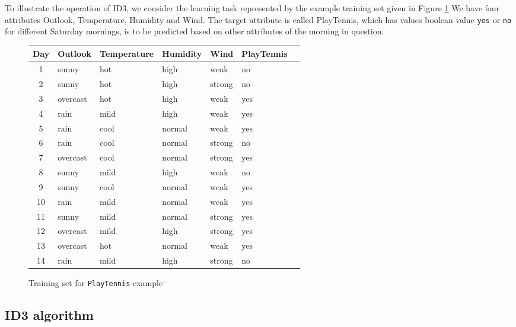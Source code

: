 \documentclass{report}
\begin{document}
To illustrate the operation of ID3, we consider the learning task represented by the example training set given in Figure \ref{fig:trainingplaytennis} We have four attributes Outlook, Temperature, Humidity and Wind. The target attribute is called PlayTennis, which has values boolean value \texttt{yes} or \texttt{no} for different Saturday mornings, is to be predicted based on other attributes of the morning in question. 
\begin{figure}[h]
  \centering
  \begin{tabular}{|c|l|l|l|l|l|l|}
    \hline
    Day & Outlook & Temperature & Humidity & Wind & PlayTennis\\
    \hline
    1 & sunny & hot & high & weak & no
    \\\hline
    2 & sunny & hot & high & strong & no
    \\\hline
    3 & overcast & hot & high & weak & yes
    \\\hline
    4 & rain & mild & high & weak & yes
    \\\hline
    5 & rain & cool & normal & weak & yes
    \\\hline
    6 & rain & cool & normal & strong & no
    \\\hline
    7 & overcast & cool & normal & strong & yes
    \\\hline
    8 & sunny & mild & high & weak & no
    \\\hline
    9 & sunny & cool & normal & weak & yes
    \\\hline
    10 & rain & mild & normal & weak & yes
    \\\hline
    11 & sunny & mild & normal & strong & yes
    \\\hline
    12 & overcast & mild & high & strong & yes
    \\\hline
    13 & overcast & hot & normal & weak & yes
    \\\hline
    14 & rain & mild & high & strong & no
    \\\hline
  \end{tabular}
  \caption{Training set for \texttt{PlayTennis} example}
  \label{fig:trainingplaytennis}
\end{figure}



\subsection{ID3 algorithm}
\label{sec:id3}
\end{document}
